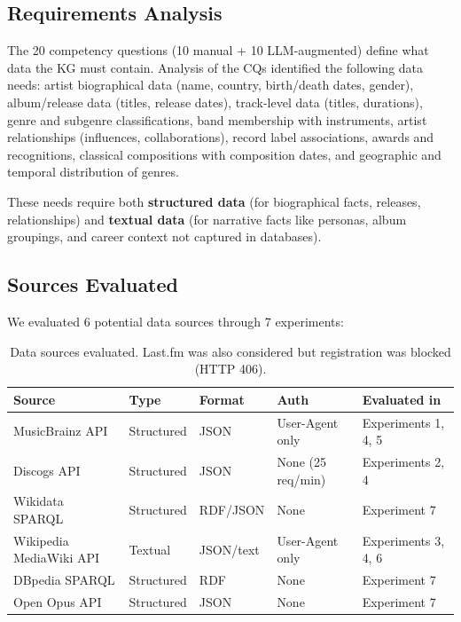 \documentclass[11pt,a4paper]{article}
\begin{document}
\subsection{Requirements Analysis}

The 20 competency questions (10 manual + 10 LLM-augmented) define what data the KG must contain. Analysis of the CQs identified the following data needs: artist biographical data (name, country, birth/death dates, gender), album/release data (titles, release dates), track-level data (titles, durations), genre and subgenre classifications, band membership with instruments, artist relationships (influences, collaborations), record label associations, awards and recognitions, classical compositions with composition dates, and geographic and temporal distribution of genres.

These needs require both \textbf{structured data} (for biographical facts, releases, relationships) and \textbf{textual data} (for narrative facts like personas, album groupings, and career context not captured in databases).

\subsection{Sources Evaluated}

We evaluated 6 potential data sources through 7 experiments:

\begin{table}[h]
\centering
\small
\begin{tabular}{lllll}
\toprule
\textbf{Source} & \textbf{Type} & \textbf{Format} & \textbf{Auth} & \textbf{Evaluated in} \\
\midrule
MusicBrainz API & Structured & JSON & User-Agent only & Experiments 1, 4, 5 \\
Discogs API & Structured & JSON & None (25 req/min) & Experiments 2, 4 \\
Wikidata SPARQL & Structured & RDF/JSON & None & Experiment 7 \\
Wikipedia MediaWiki API & Textual & JSON/text & User-Agent only & Experiments 3, 4, 6 \\
DBpedia SPARQL & Structured & RDF & None & Experiment 7 \\
Open Opus API & Structured & JSON & None & Experiment 7 \\
\bottomrule
\end{tabular}
\caption{Data sources evaluated. Last.fm was also considered but registration was blocked (HTTP 406).}
\end{table}
\end{document}
